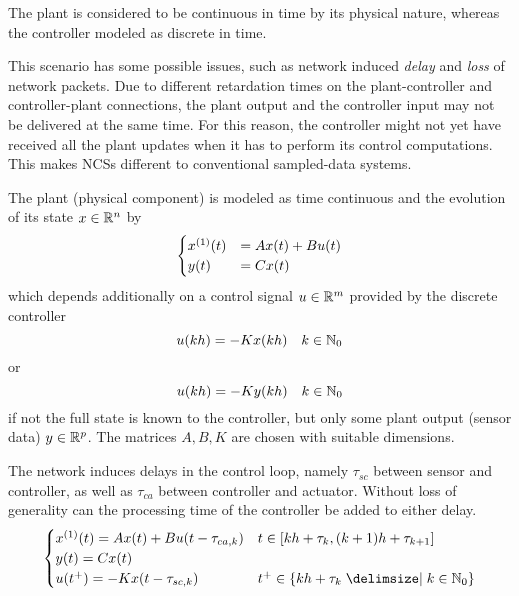 
    The plant is considered to be continuous in time by its physical nature, whereas the controller modeled as discrete in time.

    This scenario has some possible issues, such as network induced \emph{delay} and \emph{loss} of network packets.
    Due to different retardation times on the plant-controller and controller-plant connections, the plant output and the controller input may not be delivered at the same time. For this reason, the controller might not yet have received all the plant updates when it has to perform its control computations. This makes NCSs different to conventional sampled-data systems.

        The plant (physical component) is modeled as time continuous and the evolution of its state $x\in\mathbb{R}^{n}$ by
        \begin{equation*}
            \begin{cases}
                \D{x}(t) &= Ax(t) + Bu(t) \\
                y(t) &= Cx(t)
            \end{cases}
        \end{equation*}
        which depends additionally on a control signal $u\in\mathbb{R}^{m}$ provided by the discrete controller
        \begin{equation*}
            u(kh) = -Kx(kh)\quad k\in\mathbb{N}_0
        \end{equation*}
        or
        \begin{equation*}
            u(kh) = -Ky(kh)\quad k\in\mathbb{N}_0
        \end{equation*}
        if not the full state is known to the controller, but only some plant output (sensor data) $y\in\mathbb{R}^{p}$.
        The matrices $A, B, K$ are chosen with suitable dimensions. 

        The network induces delays in the control loop, namely $\tau_{sc}$ between sensor and controller, as well as $\tau_{ca}$ between controller and actuator. Without loss of generality can the processing time of the controller be added to either delay.
        \begin{equation*}
            \begin{cases}
                \D{x}(t) = Ax(t) + Bu(t-\tau_{ca,k}) &
                t\in\compactum{kh+\tau_k}{(k+1)h+\tau_{k+1}}\\
                y(t) = Cx(t) &\\
                u(t^+) = -Kx(t-\tau_{sc,k}) &
                t^+\in\set{kh+\tau_k\with k\in\N_0}
            \end{cases}
        \end{equation*}

